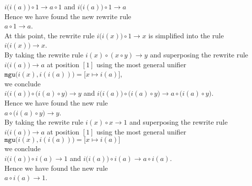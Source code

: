 \hspace*{1.3cm}
$i\bigl(i(a)\bigr) \circ 1 \rightarrow a \circ 1$ \quad and \quad
$i\bigl(i(a)\bigr) \circ 1 \rightarrow a$
\\[0.2cm]
Hence we have found the new rewrite rule
\\[0.2cm]
\hspace*{1.3cm}
$a \circ 1 \rightarrow a$.
\\[0.2cm]
At this point, the rewrite rule $i\bigl(i(x)\bigr) \circ 1 \rightarrow x$ is simplified into the rule
\\[0.2cm]
\hspace*{1.3cm}
$i\bigl(i(x)\bigr) \rightarrow x$.
\\[0.2cm]
By taking the rewrite rule $i(x) \circ (x \circ y) \rightarrow y$ and superposing the rewrite rule $i\bigl(i(a)\bigr) \rightarrow a$
at position $[1]$ using the most general unifier
\\[0.2cm]
\hspace*{1.3cm}
$\mathtt{mgu}\bigl(i(x), i(i(a))\bigr) = \bigl[x \mapsto i(a)\bigr]$,
\\[0.2cm]
we conclude
\\[0.2cm]
\hspace*{1.3cm}
$i\bigl(i(a)\bigr) \circ \bigl(i(a)\circ y\bigr) \rightarrow y$ \quad and \quad
$i\bigl(i(a)\bigr) \circ \bigl(i(a)\circ y\bigr) \rightarrow a \circ \bigl(i(a) \circ y\bigr)$.
\\[0.2cm]
Hence we have found the new rule
\\[0.2cm]
\hspace*{1.3cm}
$a \circ \bigl(i(a) \circ y\bigr) \rightarrow y$.
\\[0.2cm]
By taking the rewrite rule $i(x) \circ x \rightarrow 1$ and superposing the rewrite rule $i\bigl(i(a)\bigr) \rightarrow a$ at position
$[1]$ using the most general unifier
\\[0.2cm]
\hspace*{1.3cm}
$\mathtt{mgu}\bigl(i(x), i(i(a))\bigr) = \bigr[x \mapsto i(a)\bigr]$
\\[0.2cm]
we conclude
\\[0.2cm]
\hspace*{1.3cm}
$i\bigl(i(a)\bigr) \circ i(a) \rightarrow 1$ \quad and \quad
$i\bigl(i(a)\bigr) \circ i(a) \rightarrow a \circ i(a)$.
\\[0.2cm]
Hence we have found the new rule
\\[0.2cm]
\hspace*{1.3cm}
$a \circ i(a) \rightarrow 1$.
\\[0.2cm]
